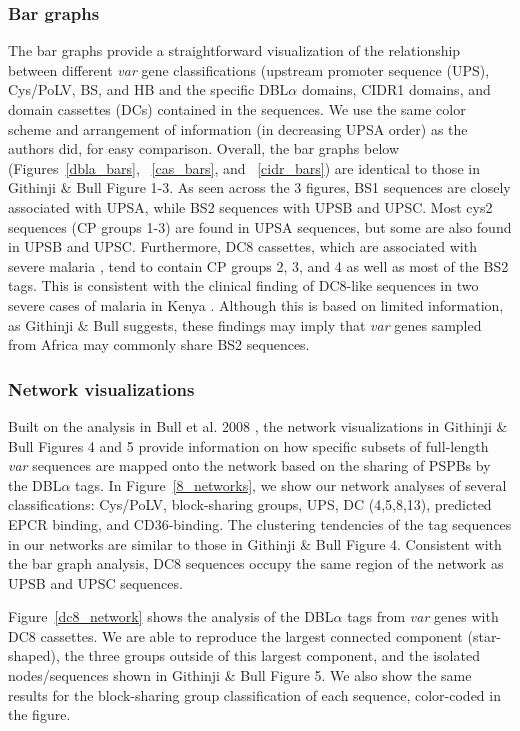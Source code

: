 \documentclass[10pt,twocolumn,superscriptaddress]{revtex4-1}
\newcommand{\var}{{\it var}\xspace}
\newcommand{\dbla}{{DBL$\alpha$}\xspace}
\newcommand{\cp}{{Cys/PoLV}\xspace}
\newcommand{\paper}{{Githinji \& Bull}\xspace}
\begin{document}
\subsubsection{Bar graphs}
The bar graphs provide a straightforward visualization of the relationship between different \var gene classifications (upstream promoter sequence (UPS), \cp, BS, and HB and the specific \dbla domains, CIDR1 domains, and domain cassettes (DCs) contained in the sequences. We use the same color scheme and arrangement of information (in decreasing UPSA order) as the authors did, for easy comparison. Overall, the bar graphs below (Figures~\ref{dbla_bars}, ~\ref{cas_bars}, and ~\ref{cidr_bars}) are identical to those in \paper Figure 1-3. As seen across the 3 figures, BS1 sequences are closely associated with UPSA, while BS2 sequences with UPSB and UPSC. Most cys2 sequences (CP groups 1-3) are found in UPSA sequences, but some are also found in UPSB and UPSC. Furthermore, DC8 cassettes, which are associated with severe malaria \cite{lavstsen2012, rask2010}, tend to contain CP groups 2, 3, and 4 as well as most of the BS2 tags. This is consistent with the clinical finding of DC8-like sequences in two severe cases of malaria in Kenya \cite{bull2005}. Although this is based on limited information, as \paper suggests, these findings may imply that \var genes sampled from Africa may commonly share BS2 sequences. 

\subsubsection{Network visualizations}
Built on the analysis in Bull et al. 2008 \cite{bull2008}, the network visualizations in \paper Figures 4 and 5 provide information on how specific subsets of full-length \var sequences are mapped onto the network based on the sharing of PSPBs by the \dbla tags. In Figure~\ref{8_networks}, we show our network analyses of several classifications: \cp, block-sharing groups, UPS, DC (4,5,8,13), predicted EPCR binding, and CD36-binding. The clustering tendencies of the tag sequences in our networks are similar to those in \paper Figure 4. Consistent with the bar graph analysis, DC8 sequences occupy the same region of the network as UPSB and UPSC sequences.  

Figure~\ref{dc8_network} shows the analysis of the \dbla tags from \var genes with DC8 cassettes. We are able to reproduce the largest connected component (star-shaped), the three groups outside of this largest component, and the isolated nodes/sequences shown in \paper Figure 5. We also show the same results for the block-sharing group classification of each sequence, color-coded in the figure.
\end{document}
